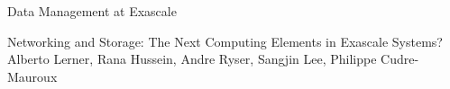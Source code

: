 \documentclass[11pt]{article}
\begin{document}
\begin{bulletin}
\begin{articlesection}{Data Management at Exascale}
\makeatletter
\renewcommand{\AB@affillist}{}
\renewcommand{\AB@authlist}{}
\setcounter{authors}{0}
\makeatother

\begin{article}
{Networking and Storage: The Next Computing Elements in Exascale Systems?}
{Alberto Lerner, Rana Hussein, Andre Ryser, Sangjin Lee, Philippe Cudre-Mauroux}
\graphicspath{{submissions/alberto/figs/}}

\end{article}

\end{articlesection}




%
%





\begin{callsection}


\end{callsection}
\end{bulletin}
\end{document}
